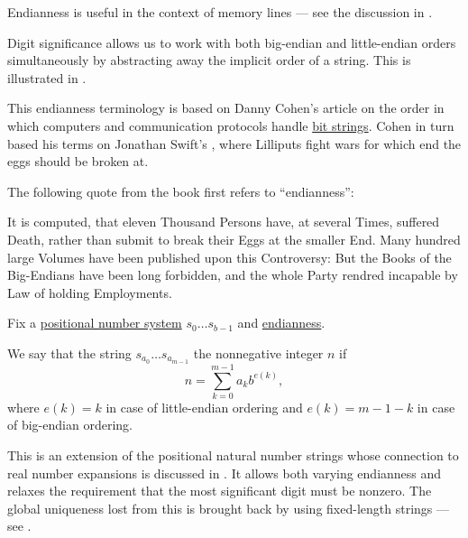 \begin{comments}
  \item Endianness is useful in the context of memory lines --- see the discussion in .

  \item Digit significance allows us to work with both big-endian and little-endian orders simultaneously by abstracting away the implicit order of a string. This is illustrated in .

  \item This endianness terminology is based on Danny Cohen's article \cite{Cohen1981Endianness} on the order in which computers and communication protocols handle \hyperref[def:bit_string]{bit strings}. Cohen in turn based his terms on Jonathan Swift's \cite{Swift2005GulliverTravels}, where Lilliputs fight wars for which end the eggs should be broken at.

  The following quote from the book first refers to \enquote{endianness}:
  \begin{displayquote}
    It is computed, that eleven Thousand Persons have, at several Times, suffered Death, rather than submit to break their Eggs at the smaller End. Many hundred large Volumes have been published upon this Controversy: But the Books of the Big-Endians have been long forbidden, and the whole Party rendred incapable by Law of holding Employments.
  \end{displayquote}
\end{comments}

\begin{definition}\label{def:fixed_length_nonnegative_integer_encoding}\mimprovised
  Fix a \hyperref[def:positional_number_system]{positional number system} \( s_0 \ldots s_{b-1} \) and \hyperref[def:endianness]{endianness}.

  We say that the string \( s_{a_0} \ldots s_{a_{m-1}} \)  the nonnegative integer \( n \) if
  \begin{equation*}
    n = \sum_{k=0}^{m-1} a_k b^{e(k)},
  \end{equation*}
  where \( e(k) = k \) in case of little-endian ordering and \( e(k) = m - 1 - k \) in case of big-endian ordering.
\end{definition}
\begin{comments}
  \item This is an extension of the positional natural number strings whose connection to real number expansions is discussed in . It allows both varying endianness and relaxes the requirement that the most significant digit must be nonzero. The global uniqueness lost from this is brought back by using fixed-length strings --- see .
\end{comments}

